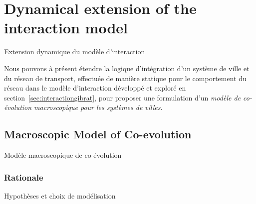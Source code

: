 




\newpage

\section{Dynamical extension of the interaction model}{Extension dynamique du modèle d'interaction}



\label{sec:macrocoevol}





Nous pouvons à présent étendre la logique d'intégration d'un système de ville et du réseau de transport, effectuée de manière statique pour le comportement du réseau dans le modèle d'interaction développé et exploré en section~\ref{sec:interactiongibrat}, pour proposer une formulation d'un \emph{modèle de co-évolution macroscopique pour les systèmes de villes}.



\subsection{Macroscopic Model of Co-evolution}{Modèle macroscopique de co-évolution}


\subsubsection{Rationale}{Hypothèses et choix de modélisation}



